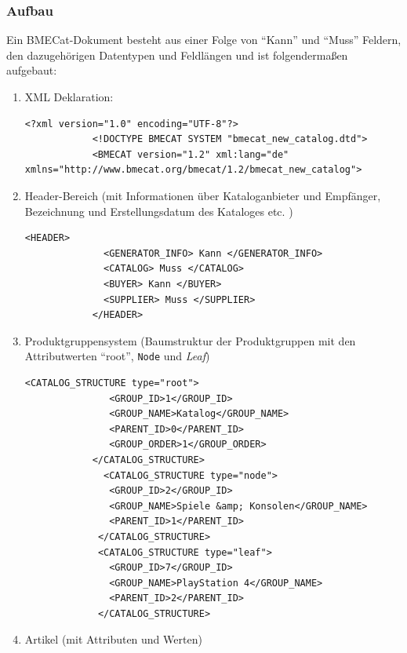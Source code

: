	\subsubsection{Aufbau}
	
	Ein BMECat-Dokument besteht aus einer Folge von \enquote{Kann} und \enquote{Muss} Feldern, den dazugehörigen Datentypen und Feldlängen und ist folgendermaßen aufgebaut:
		
		\begin{enumerate}
		
			\item 
			XML Deklaration:
			\begin{lstlisting}[caption={XML Deklaration in einem BMECat-Dokument}] 
			<?xml version="1.0" encoding="UTF-8"?>
			<!DOCTYPE BMECAT SYSTEM "bmecat_new_catalog.dtd">
			<BMECAT version="1.2" xml:lang="de" xmlns="http://www.bmecat.org/bmecat/1.2/bmecat_new_catalog">
			\end{lstlisting}
			
			\item
			Header-Bereich (mit Informationen über Kataloganbieter und Empfänger, Bezeichnung und Erstellungsdatum des Kataloges etc.  )
			\begin{lstlisting}[caption={Header-Sektion in einem BMECat-Dokument}]  %vernünftige Daten
			<HEADER> 
			  <GENERATOR_INFO> Kann </GENERATOR_INFO>
			  <CATALOG> Muss </CATALOG>
			  <BUYER> Kann </BUYER>
			  <SUPPLIER> Muss </SUPPLIER>
			</HEADER>
			\end{lstlisting}
			\pagebreak
			\item Produktgruppensystem (Baumstruktur der Produktgruppen mit den Attributwerten \enquote{root}, \texttt{Node} und \textit{Leaf})
			\begin{lstlisting}[caption={Produktgruppensystem in einem BMECat-Dokument }] 
			<CATALOG_STRUCTURE type="root">
			   <GROUP_ID>1</GROUP_ID>
			   <GROUP_NAME>Katalog</GROUP_NAME>
			   <PARENT_ID>0</PARENT_ID>
			   <GROUP_ORDER>1</GROUP_ORDER>
			</CATALOG_STRUCTURE>
			  <CATALOG_STRUCTURE type="node">
			   <GROUP_ID>2</GROUP_ID>
			   <GROUP_NAME>Spiele &amp; Konsolen</GROUP_NAME>
			   <PARENT_ID>1</PARENT_ID>
			 </CATALOG_STRUCTURE>
			 <CATALOG_STRUCTURE type="leaf">
			   <GROUP_ID>7</GROUP_ID>
			   <GROUP_NAME>PlayStation 4</GROUP_NAME>
			   <PARENT_ID>2</PARENT_ID>
			 </CATALOG_STRUCTURE>
			\end{lstlisting}
			
			
			
			\item Artikel (mit Attributen und Werten)
			

\end{enumerate}
